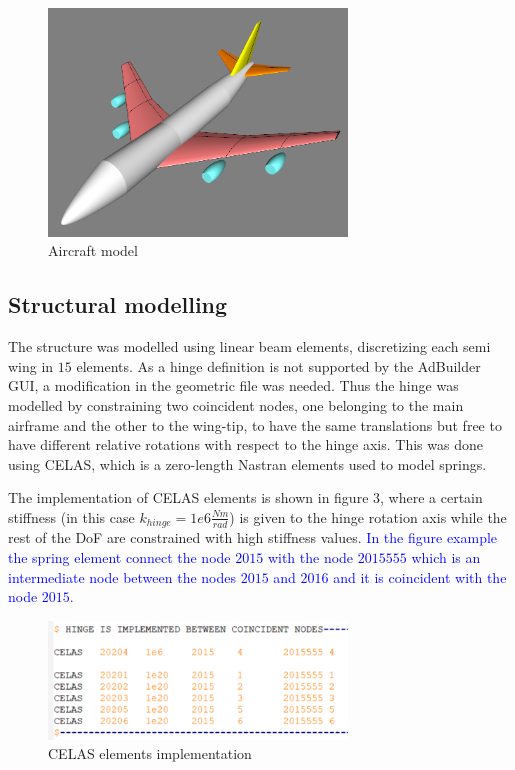 \documentclass[conference]{IEEEtran}
\newlength\figureheight
\newlength\figurewidth
\begin{document}
\begin{figure}[htp]
  \centering
  \setlength\figureheight{5cm}
  \setlength\figurewidth{7cm}
  \includegraphics[width=225pt]{images/AircraftModel.png}
  \caption{Aircraft model}
  \label{fig:my-figure}
\end{figure}

\subsection{Structural modelling}
The structure was modelled using linear beam elements, discretizing each semi wing in $15$ elements. As a hinge definition is not supported by the AdBuilder GUI, a modification in the geometric file was needed. Thus the hinge was modelled by constraining two coincident nodes, one belonging to the main airframe and the other to the wing-tip, to have the same translations but free to have different relative rotations with respect to the hinge axis. This was done using CELAS, which is a zero-length Nastran elements used to model springs.

The implementation of CELAS elements is shown in figure 3, where a certain stiffness (in this case $k_{hinge} = 1e6 \frac{Nm}{rad}$) is given to the hinge rotation axis while the rest of the DoF are constrained with high stiffness values. \textcolor{blue}{In the figure example the spring element connect the node $2015$ with the node $2015555$ which is an intermediate node between the nodes $2015$ and $2016$ and it is coincident with the node $2015$.}

\begin{figure}[htp]
  \centering
  \setlength\figureheight{5cm}
  \setlength\figurewidth{7cm}
  \includegraphics[width=225pt]{images/NastranHinge.png}
  \caption{CELAS elements implementation}
  \label{fig:my-figure}
\end{figure}
\end{document}
